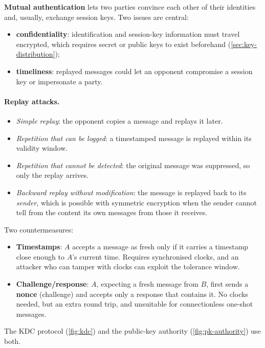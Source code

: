 \textbf{Mutual authentication} lets two parties convince each other of their identities and, usually, exchange session keys. Two issues are central:
\begin{itemize}
    \item \textbf{confidentiality}: identification and session-key information must travel encrypted, which requires secret or public keys to exist beforehand (\cref{sec:key-distribution});
    \item \textbf{timeliness}: replayed messages could let an opponent compromise a session key or impersonate a party.
\end{itemize}

\paragraph{Replay attacks.}
\begin{itemize}
    \item \emph{Simple replay}: the opponent copies a message and replays it later.
    \item \emph{Repetition that can be logged}: a timestamped message is replayed within its validity window.
    \item \emph{Repetition that cannot be detected}: the original message was suppressed, so only the replay arrives.
    \item \emph{Backward replay without modification}: the message is replayed back to its \emph{sender}, which is possible with symmetric encryption when the sender cannot tell from the content its own messages from those it receives.
\end{itemize}
Two countermeasures:
\begin{itemize}
    \item \textbf{Timestamps}: $A$ accepts a message as fresh only if it carries a timestamp close enough to $A$'s current time. Requires synchronised clocks, and an attacker who can tamper with clocks can exploit the tolerance window.
    \item \textbf{Challenge/response}: $A$, expecting a fresh message from $B$, first sends a \textbf{nonce} (challenge) and accepts only a response that contains it. No clocks needed, but an extra round trip, and unsuitable for connectionless one-shot messages.
\end{itemize}
The KDC protocol (\cref{fig:kdc}) and the public-key authority (\cref{fig:pk-authority}) use both.


